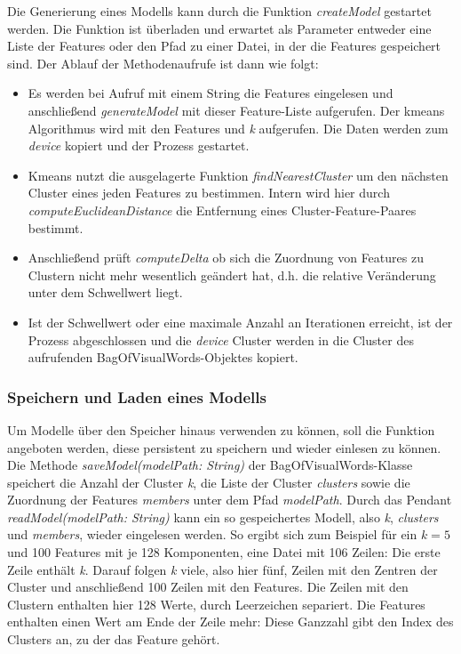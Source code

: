 Die Generierung eines Modells kann durch die Funktion \textit{createModel} gestartet werden. Die Funktion ist überladen und erwartet als Parameter entweder eine Liste der Features oder den Pfad zu einer Datei, in der die Features gespeichert sind. Der Ablauf der Methodenaufrufe ist dann wie folgt:

\begin{itemize}
	\item Es werden bei Aufruf mit einem String die Features eingelesen und anschließend \textit{generateModel} mit dieser Feature-Liste aufgerufen. Der kmeans Algorithmus wird mit den Features und \textit{k} aufgerufen. Die Daten werden zum \textit{device} kopiert und der Prozess gestartet. 
	\item Kmeans nutzt die ausgelagerte Funktion \textit{findNearestCluster} um den nächsten Cluster eines jeden Features zu bestimmen. Intern wird hier durch \textit{computeEuclideanDistance} die Entfernung eines Cluster-Feature-Paares bestimmt.
	\item Anschließend prüft \textit{computeDelta} ob sich die Zuordnung von Features zu Clustern nicht mehr wesentlich geändert hat, d.h. die relative Veränderung unter dem Schwellwert liegt.
	\item Ist der Schwellwert oder eine maximale Anzahl an Iterationen erreicht, ist der Prozess abgeschlossen und die \textit{device} Cluster werden in die Cluster des aufrufenden BagOfVisualWords-Objektes kopiert.
\end{itemize}
 
\subsubsection{Speichern und Laden eines Modells}

Um Modelle über den Speicher hinaus verwenden zu können, soll die Funktion angeboten werden, diese persistent zu speichern und wieder einlesen zu können. Die Methode \textit{saveModel(modelPath: String)} der BagOfVisualWords-Klasse speichert die Anzahl der Cluster \textit{k}, die Liste der Cluster \textit{clusters} sowie die Zuordnung der Features \textit{members} unter dem Pfad \textit{modelPath}. Durch das Pendant \textit{readModel(modelPath: String)} kann ein so gespeichertes Modell, also \textit{k}, \textit{clusters} und \textit{members}, wieder eingelesen werden.\newline
So ergibt sich zum Beispiel für ein $k = 5$ und 100 Features mit je 128 Komponenten, eine Datei mit 106 Zeilen: Die erste Zeile enthält \textit{k}. Darauf folgen \textit{k} viele, also hier fünf, Zeilen mit den Zentren der Cluster und anschließend 100 Zeilen mit den Features. Die Zeilen mit den Clustern enthalten hier 128 Werte, durch Leerzeichen separiert. Die Features enthalten einen Wert am Ende der Zeile mehr: Diese Ganzzahl gibt den Index des Clusters an, zu der das Feature gehört.

